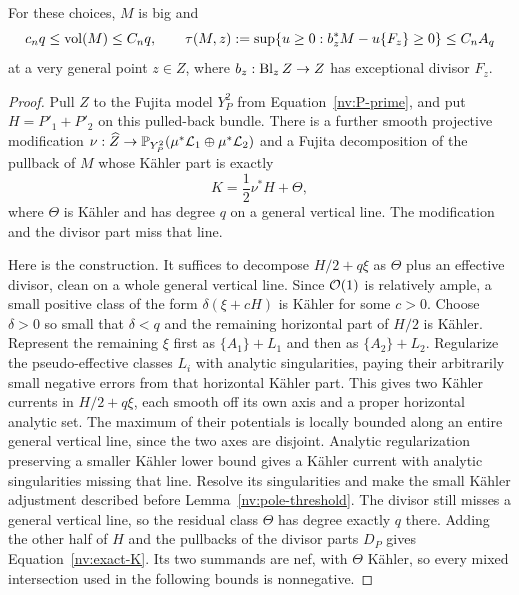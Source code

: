 \begin{lemma}\label{nv:two-slot-volume}
For these choices, \(M\) is big and
\begin{equation}\label{nv:M-bounds}
 c_nq\le\operatorname{vol}(M)\le C_nq,\qquad
 \tau(M,z):=\sup\{u\ge0:b_z^*M-u\{F_z\}\ge0\}\le C_nA_q
\end{equation}
at a very general point \(z\in Z\), where
\(b_z:\operatorname{Bl}_zZ\to Z\) has exceptional divisor \(F_z\).
\end{lemma}

\begin{proof}
Pull \(Z\) to the Fujita model \(Y_P^2\) from
Equation~\eqref{nv:P-prime}, and put \(H=P'_1+P'_2\) on this pulled-back bundle.
There is a further smooth projective modification
\(\nu:\widehat Z\to\mathbb P_{Y_P^2}(\mu^*\mathcal{L}_1\oplus
\mu^*\mathcal{L}_2)\) and a Fujita decomposition of the pullback of \(M\)
whose Kähler part is exactly
\begin{equation}\label{nv:exact-K}
 K=\frac12\nu^*H+\Theta ,
\end{equation}
where \(\Theta\) is Kähler and has degree \(q\) on a general vertical
line.  The modification and the divisor part miss that line.

Here is the construction.  It suffices to decompose \(H/2+q\xi\) as
\(\Theta\) plus an effective divisor, clean on a whole general vertical
line.  Since \(\mathcal O(1)\) is relatively ample, a small positive class of
the form \(\delta(\xi+cH)\) is Kähler for some \(c>0\).  Choose
\(\delta>0\) so small that \(\delta<q\) and the remaining horizontal
part of \(H/2\) is Kähler.  Represent the remaining \(\xi\) first as
\(\{A_1\}+L_1\) and then as \(\{A_2\}+L_2\).  Regularize the
pseudo-effective classes \(L_i\) with analytic singularities, paying
their arbitrarily small negative errors from that horizontal Kähler
part.  This gives two Kähler currents in \(H/2+q\xi\), each smooth off
its own axis and a proper horizontal analytic set.  The maximum of
their potentials is locally bounded along an entire general vertical
line, since the two axes are disjoint.  Analytic regularization
preserving a smaller Kähler lower bound
\cite[Theorem~2.1(ii)]{Boucksom2004} gives a Kähler current with
analytic singularities missing that line.  Resolve its singularities
and make the small Kähler adjustment described before
Lemma~\ref{nv:pole-threshold}.  The divisor still misses a general
vertical line, so the residual class \(\Theta\) has degree exactly
\(q\) there.  Adding the other half of \(H\) and the pullbacks of the
divisor parts \(D_P\) gives Equation~\eqref{nv:exact-K}.  Its two
summands are nef, with \(\Theta\) Kähler, so every mixed intersection
used in the following bounds is nonnegative.


\end{proof}
